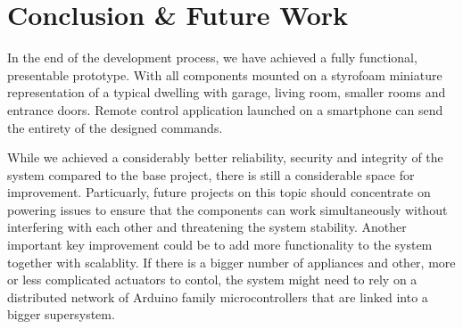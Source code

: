 \documentclass[journal,onecolumn]{IEEEtran}
\begin{document}
\section{Conclusion \& Future Work}

In the end of the development process, we have achieved a fully functional, presentable prototype. With all components mounted on a styrofoam miniature representation of a typical dwelling with garage, living room, smaller rooms and entrance doors. Remote control application launched on a smartphone can send the entirety of the designed commands. 

While we achieved a considerably better reliability, security and integrity of the system compared to the base project, there is still a considerable space for improvement. Particuarly, future projects on this topic should concentrate on powering issues to ensure that the components can work simultaneously without interfering with each other and threatening the system stability. Another important key improvement could be to add more functionality to the system together with scalablity. If there is a bigger number of appliances and other, more or less complicated actuators to contol, the system might need to rely on a distributed network of Arduino family microcontrollers that are linked into a bigger supersystem.
\end{document}
